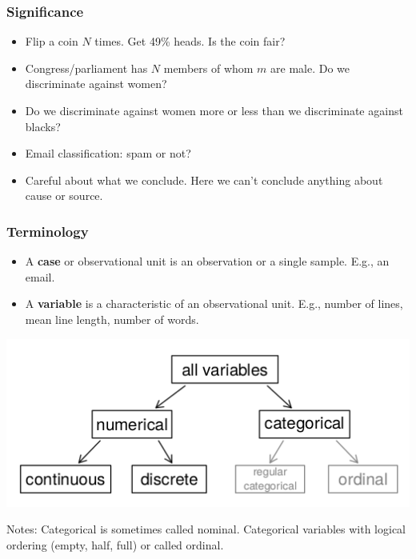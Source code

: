 \documentclass[t]{beamer}
\begin{document}
\begin{frame}
  \frametitle{Significance}

  \begin{itemize}
  \item Flip a coin $N$ times.  Get 49\% heads.  Is the coin fair?
  \item Congress/parliament has $N$ members of whom $m$ are male.  Do
    we discriminate against women?
  \item Do we discriminate against women more or less than we
    discriminate against blacks?
  \item Email classification: spam or not?
  \item Careful about what we conclude.  Here we can't conclude
    anything about cause or source.
  \end{itemize}

  
\end{frame}

\begin{frame}
  \frametitle{Terminology}

  \begin{itemize}
  \item A \textbf{case} or {observational unit} is an observation or a
    single sample.  E.g., an email.
  \item A \textbf{variable} is a characteristic of an observational
    unit.  E.g., number of lines, mean line length, number of words.
  \end{itemize}
  \includegraphics[width=.9\textwidth]{variable-types.png}

  Notes:  Categorical is sometimes called nominal.  Categorical
  variables with logical ordering (empty, half, full) or called ordinal.
\end{frame}
\end{document}
